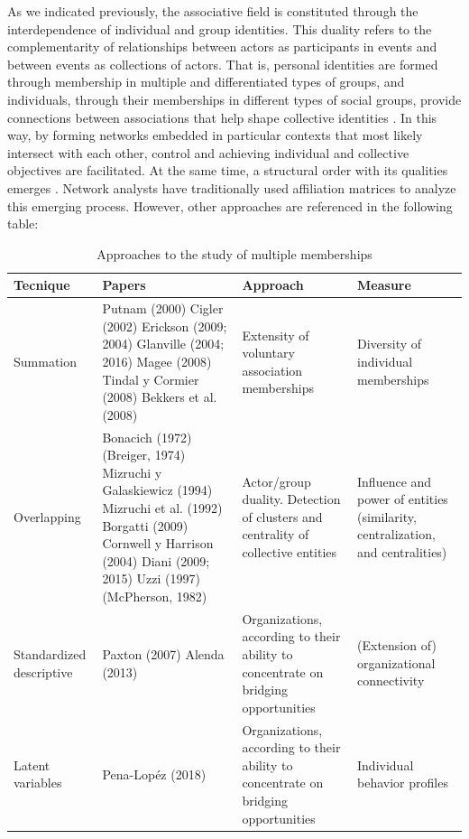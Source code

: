 As we indicated previously, the associative field is constituted through the interdependence of individual and group identities. This duality refers to the complementarity of relationships between actors as participants in events and between events as collections of actors. That is, personal identities are formed through membership in multiple and differentiated types of groups, and individuals, through their memberships in different types of social groups, provide connections between associations that help shape collective identities \parencite{bonacich_technique_1972, bonacich_latent_1981, breiger_duality_1974, diani_cement_2015}. In this way, by forming networks embedded in particular contexts that most likely intersect with each other, control and achieving individual and collective objectives are facilitated. At the same time, a structural order with its qualities emerges \parencite{kontopoulos_logics_1993, mann_sources_1986, white_identity_2008}. Network analysts have traditionally used affiliation matrices to analyze this emerging process. However, other approaches are referenced in the following table:
\bigskip

\begin{table}[H]
\footnotesize 
\label{table: table1}
\setlength{\tymin}{40pt} %
\let\raggedright\RaggedRight

\begin{tabulary}{\textwidth}{@{}p{2.5cm} p{5cm} p{3cm} p{3cm}@{}}
\toprule
\textbf{Tecnique} &
  \textbf{Papers} &
  \textbf{Approach} &
  \textbf{Measure} \\
\midrule
Summation    & Putnam (2000) Cigler (2002) Erickson (2009; 2004) Glanville (2004; 2016) Magee (2008) Tindal y Cormier (2008) Bekkers et al. (2008) 
             & Extensity of voluntary association memberships
             & Diversity of individual memberships \\

Overlapping  & Bonacich (1972) (Breiger, 1974) Mizruchi y Galaskiewicz (1994) Mizruchi et al. (1992) Borgatti (2009) Cornwell y Harrison (2004) Diani (2009; 2015) Uzzi (1997) (McPherson, 1982) 
             & Actor/group duality. Detection of clusters and centrality of collective entities
             & Influence and power of entities (similarity, centralization, and centralities)\\
Standardized descriptive  & Paxton (2007) Alenda (2013) 
                          & Organizations, according to their ability to concentrate on bridging opportunities
                          & (Extension of) organizational connectivity\\
Latent variables  & Pena-Lopéz (2018)  
                  & Organizations, according to their ability to concentrate on bridging opportunities
                  & Individual behavior profiles\\
\bottomrule
\end{tabulary}

\caption{Approaches to the study of multiple memberships}
\label{}

\end{table}

